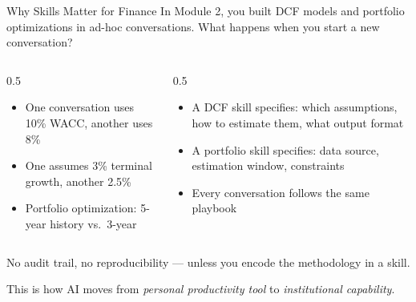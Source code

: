 \documentclass[aspectratio=169]{beamer}
\begin{document}
\begin{frame}{Why Skills Matter for Finance}
In Module 2, you built DCF models and portfolio optimizations in ad-hoc conversations. What happens when you start a new conversation?
\vspace{0.3cm}
\begin{columns}[T]
\begin{column}{0.5\textwidth}
\begin{shadedbox}[title=\textbf{The Problem}]
\begin{itemize}\small
  \item One conversation uses 10\% WACC, another uses 8\%
  \item One assumes 3\% terminal growth, another 2.5\%
  \item Portfolio optimization: 5-year history vs.\ 3-year
\end{itemize}
\end{shadedbox}
\end{column}
\begin{column}{0.5\textwidth}
\begin{shadedbox}[title=\textbf{The Fix: Skills}]
\begin{itemize}\small
  \item A DCF skill specifies: which assumptions, how to estimate them, what output format
  \item A portfolio skill specifies: data source, estimation window, constraints
  \item \alert{Every conversation follows the same playbook}
\end{itemize}
\end{shadedbox}
\end{column}
\end{columns}
\vspace{0.3cm}
\alert{No audit trail, no reproducibility --- unless you encode the methodology in a skill.}
\vspace{0.2cm}
\begin{center}
This is how AI moves from \textit{personal productivity tool} to \textit{institutional capability}.
\end{center}
\end{frame}
\end{document}
